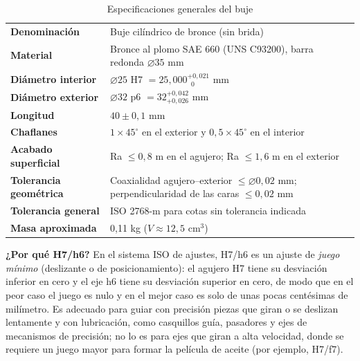\documentclass[12pt,a4paper]{article}
\begin{document}
\begin{table}[!htb]
	\centering
	\caption{Especificaciones generales del buje}\label{tab:pieza}
	\small
	\begin{tabularx}{\linewidth}{>{\bfseries}l X}
		Denominación          & Buje cilíndrico de bronce (sin brida)
		\\
		Material              & Bronce al plomo SAE 660 (UNS C93200), barra
		redonda $\varnothing 35$ mm                                                                                                       \\
		Diámetro interior     & $\varnothing 25$ H7 $=
			                                            25{,}000^{+0{,}021}_{\;\;0}$ mm                                                      \\
		Diámetro exterior     & $\varnothing 32$ p6 $= 32^{+0{,}042}_{+0{,}026}$
		mm                                                                                                                                \\
		Longitud              & $40 \pm 0{,}1$ mm
		\\
		Chaflanes             & $1\times45^\circ$ en el exterior y
		$0{,}5\times45^\circ$ en el interior                                                                                              \\
		Acabado superficial   & Ra $\le 0{,}8$ \textmu m en el agujero; Ra $\le
			                                                                   1{,}6$ \textmu m en el exterior                               \\
		Tolerancia geométrica & Coaxialidad agujero--exterior $\le \varnothing 0{,}02$ mm; perpendicularidad de las caras $\le 0{,}02$ mm \\
		Tolerancia general    & ISO 2768-m para cotas sin tolerancia indicada                                                             \\
		Masa aproximada       & 0,11 kg ($V\approx 12{,}5$ cm$^3$)                                                                        \\
	\end{tabularx}
\end{table}

\textbf{¿Por qué H7/h6?} En el sistema ISO de ajustes, H7/h6 es un ajuste de
\emph{juego mínimo} (deslizante o de posicionamiento): el agujero H7 tiene su
desviación inferior en cero y el eje h6 tiene su desviación superior en cero,
de modo que en el peor caso el juego es nulo y en el mejor caso es solo de unas
pocas centésimas de milímetro. Es adecuado para guiar con precisión piezas que
giran o se deslizan lentamente y con lubricación, como casquillos guía,
pasadores y ejes de mecanismos de precisión; no lo es para ejes que giran a alta
velocidad, donde se requiere un juego mayor para formar la película de aceite
(por ejemplo, H7/f7).
\end{document}
